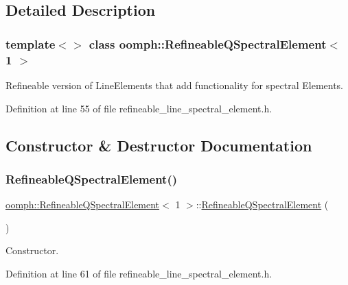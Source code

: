 \subsection{Detailed Description}
\subsubsection*{template$<$$>$\newline
class oomph\+::\+Refineable\+Q\+Spectral\+Element$<$ 1 $>$}

Refineable version of Line\+Elements that add functionality for spectral Elements. 

Definition at line 55 of file refineable\+\_\+line\+\_\+spectral\+\_\+element.\+h.



\subsection{Constructor \& Destructor Documentation}
\mbox{\label{classoomph_1_1RefineableQSpectralElement_3_011_01_4_a309518c58b6d071df3c12f6b5917b991}} 
\subsubsection{\texorpdfstring{Refineable\+Q\+Spectral\+Element()}{RefineableQSpectralElement()}\hspace{0.1cm}{\footnotesize\ttfamily [1/2]}}
{\footnotesize\ttfamily \hyperlink{classoomph_1_1RefineableQSpectralElement}{oomph\+::\+Refineable\+Q\+Spectral\+Element}$<$ 1 $>$\+::\hyperlink{classoomph_1_1RefineableQSpectralElement}{Refineable\+Q\+Spectral\+Element} (\begin{DoxyParamCaption}{ }\end{DoxyParamCaption})\hspace{0.3cm}{\ttfamily [inline]}}



Constructor. 



Definition at line 61 of file refineable\+\_\+line\+\_\+spectral\+\_\+element.\+h.



